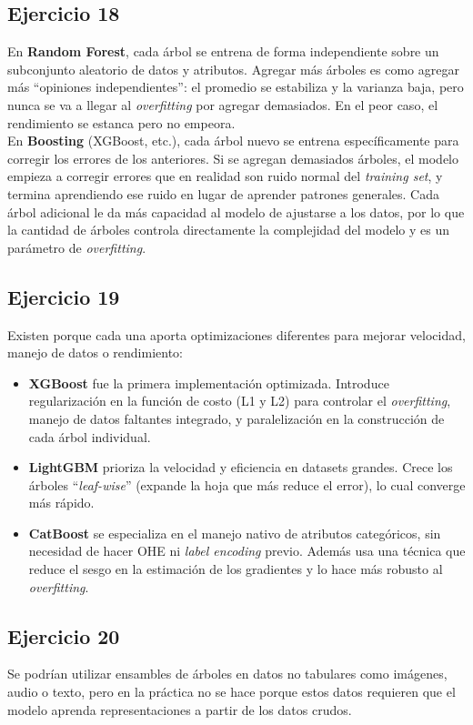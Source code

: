 \documentclass[a4paper,12pt]{article}
\begin{document}
        \subsection*{Ejercicio 18}
            \noindent En \textbf{Random Forest}, cada árbol se entrena de forma independiente sobre un subconjunto aleatorio de datos y atributos. Agregar más árboles es como agregar más ``opiniones independientes'': el promedio se estabiliza y la varianza baja, pero nunca se va a llegar al \textit{overfitting} por agregar demasiados. En el peor caso, el rendimiento se estanca pero no empeora. \\

            \noindent En \textbf{Boosting} (XGBoost, etc.), cada árbol nuevo se entrena específicamente para corregir los errores de los anteriores. Si se agregan demasiados árboles, el modelo empieza a corregir errores que en realidad son ruido normal del \textit{training set}, y termina aprendiendo ese ruido en lugar de aprender patrones generales. Cada árbol adicional le da más capacidad al modelo de ajustarse a los datos, por lo que la cantidad de árboles controla directamente la complejidad del modelo y es un parámetro de \textit{overfitting}.
        \subsection*{Ejercicio 19}
            \noindent Existen porque cada una aporta optimizaciones diferentes para mejorar velocidad, manejo de datos o rendimiento:
            \begin{itemize}
                \item \textbf{XGBoost} fue la primera implementación optimizada. Introduce regularización en la función de costo (L1 y L2) para controlar el \textit{overfitting}, manejo de datos faltantes integrado, y paralelización en la construcción de cada árbol individual.
                \item \textbf{LightGBM} prioriza la velocidad y eficiencia en datasets grandes. Crece los árboles ``\textit{leaf-wise}'' (expande la hoja que más reduce el error), lo cual converge más rápido.
                \item \textbf{CatBoost} se especializa en el manejo nativo de atributos categóricos, sin necesidad de hacer OHE ni \textit{label encoding} previo. Además usa una técnica que reduce el sesgo en la estimación de los gradientes y lo hace más robusto al \textit{overfitting}.
            \end{itemize}
        \subsection*{Ejercicio 20}
            \noindent Se podrían utilizar ensambles de árboles en datos no tabulares como imágenes, audio o texto, pero en la práctica no se hace porque estos datos requieren que el modelo aprenda representaciones a partir de los datos crudos. 
\end{document}
